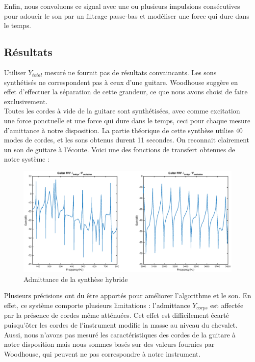 Enfin, nous convoluons ce signal avec une ou plusieurs impulsions consécutives pour adoucir le son par un filtrage passe-bas et modéliser une force qui dure dans le temps.

\subsection{Résultats}
%

Utiliser $Y_{total}$ mesuré ne fournit pas de résultats convaincants. Les sons synthétisés ne correspondent pas à ceux d'une guitare. Woodhouse suggère en effet d'effectuer la séparation de cette grandeur, ce que nous avons choisi de faire exclusivement.\\

Toutes les cordes à vide de la guitare sont synthétisées, avec comme excitation une force ponctuelle et une force qui dure dans le temps, ceci pour chaque mesure d'amittance à notre disposition. La partie théorique de cette synthèse utilise 40 modes de cordes, et les sons obtenus durent 11 secondes. On reconnait clairement un son de guitare à l'écoute. Voici une des fonctions de transfert obtenues de notre système :

\begin{figure}[h]
\centering
\includegraphics[width=\linewidth]{../figures/FRF_E2.eps}
\caption{Admittance de la synthèse hybride}
\label{fig:frf_fig_1}
\end{figure}


Plusieurs précisions ont du être apportés pour améliorer l'algorithme et le
son. En effet, ce système comporte plusieurs limitations : l'admittance
$Y_{corps}$ est affectée par la présence de cordes même atténuées. Cet effet est difficilement écarté puisqu'ôter les cordes de l'instrument modifie la masse au niveau du chevalet. Aussi, nous n'avons pas mesuré les caractéristiques des cordes de la guitare à notre disposition mais nous sommes basés sur des valeurs fournies par Woodhouse, qui peuvent ne pas correspondre à notre instrument.\\



